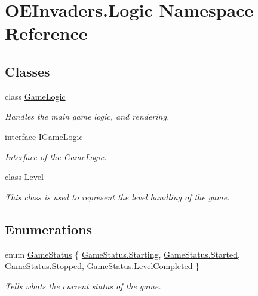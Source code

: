 \hypertarget{namespace_o_e_invaders_1_1_logic}{}\section{O\+E\+Invaders.\+Logic Namespace Reference}
\label{namespace_o_e_invaders_1_1_logic}
\subsection*{Classes}
\begin{DoxyCompactItemize}
\item 
class \mbox{\hyperlink{class_o_e_invaders_1_1_logic_1_1_game_logic}{Game\+Logic}}
\begin{DoxyCompactList}\small\item\em Handles the main game logic, and rendering. \end{DoxyCompactList}\item 
interface \mbox{\hyperlink{interface_o_e_invaders_1_1_logic_1_1_i_game_logic}{I\+Game\+Logic}}
\begin{DoxyCompactList}\small\item\em Interface of the \mbox{\hyperlink{class_o_e_invaders_1_1_logic_1_1_game_logic}{Game\+Logic}}. \end{DoxyCompactList}\item 
class \mbox{\hyperlink{class_o_e_invaders_1_1_logic_1_1_level}{Level}}
\begin{DoxyCompactList}\small\item\em This class is used to represent the level handling of the game. \end{DoxyCompactList}\end{DoxyCompactItemize}
\subsection*{Enumerations}
\begin{DoxyCompactItemize}
\item 
enum \mbox{\hyperlink{namespace_o_e_invaders_1_1_logic_a3a33299067117ed9f3eb584100b34298}{Game\+Status}} \{ \mbox{\hyperlink{namespace_o_e_invaders_1_1_logic_a3a33299067117ed9f3eb584100b34298ac2efe4bbd13e6cb0db293e72884273c0}{Game\+Status.\+Starting}}, 
\mbox{\hyperlink{namespace_o_e_invaders_1_1_logic_a3a33299067117ed9f3eb584100b34298a8428552d86c0d262a542a528af490afa}{Game\+Status.\+Started}}, 
\mbox{\hyperlink{namespace_o_e_invaders_1_1_logic_a3a33299067117ed9f3eb584100b34298ac23e2b09ebe6bf4cb5e2a9abe85c0be2}{Game\+Status.\+Stopped}}, 
\mbox{\hyperlink{namespace_o_e_invaders_1_1_logic_a3a33299067117ed9f3eb584100b34298af3f8a8d70e59a2f75919906f9429e8c2}{Game\+Status.\+Level\+Completed}}
 \}
\begin{DoxyCompactList}\small\item\em Tells what\textquotesingle{}s the current status of the game. \end{DoxyCompactList}\end{DoxyCompactItemize}


